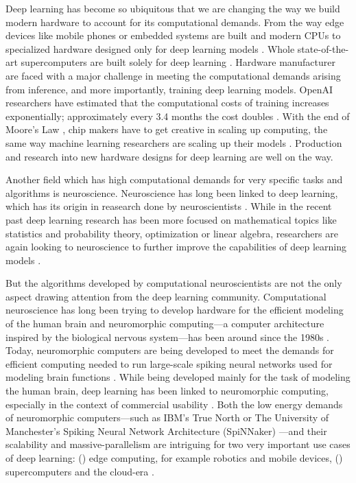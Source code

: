 \documentclass[]{article}
\begin{document}
Deep learning has become so ubiquitous that we are changing the
way we build modern hardware to account for its computational demands.
From the way edge devices like mobile phones or embedded systems are
built and modern CPUs to specialized hardware designed only for deep
learning models \citep{deng_2019, boitano_2020, perez_2017,
  jouppi_et_al_2017}.
Whole state-of-the-art supercomputers are built solely for deep
learning \citep{langston_2020}.
Hardware manufacturer are faced with a major challenge in meeting the
computational demands arising from inference, and more importantly,
training deep learning models.
OpenAI researchers have estimated that the computational costs of
training increases exponentially; approximately every 3.4 months the
cost doubles \citep{amodei_et_al_2019}.
With the end of Moore's Law \citep{loeffler_2018}, chip makers have to
get creative in scaling up computing, the same way machine learning
researchers are scaling up their models \citep{simonite_2016}.
Production and research into new hardware designs for deep learning
are well on the way.

Another field which has high computational demands for very specific
tasks and algorithms is neuroscience.
Neuroscience has long been linked to deep learning, which has its
origin in reasearch done by neuroscientists
\citep{mcculloch_et_al_1943}.
While in the recent past deep learning research has been more focused
on mathematical topics like statistics and probability theory,
optimization or linear algebra, researchers are again looking to
neuroscience to further improve the capabilities of deep
learning models \citep{marblestone_et_al_2016}.

But the algorithms developed by computational neuroscientists are not
the only aspect drawing attention from the deep learning community.
Computational neuroscience has long been trying to develop hardware
for the efficient modeling of the human brain and neuromorphic
computing---a computer architecture inspired by the biological
nervous system---has been around since the 1980s \citep{mead_1989}.
Today, neuromorphic computers are being developed to meet the
demands for efficient computing needed to run large-scale
spiking neural networks used for modeling brain
functions \citep{furber_2016}.
While being developed mainly for the task of modeling the human brain,
deep learning has been linked to neuromorphic computing,
especially in the context of commercial usability \citep{gomes_2017}.
Both the low energy demands of neuromorphic computers---such as IBM's
True North \citep{cassidy_et_al_2013} or The University of
Manchester's Spiking Neural Network Architecture (SpiNNaker)
\citep{furber_et_al_2006}---and their
scalability and massive-parallelism are intriguing for two very
important use cases of deep learning:
() edge computing, for example robotics
and mobile devices, () supercomputers and the
cloud-era \citep{gomes_2017}.
\end{document}
